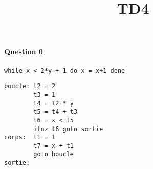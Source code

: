 \documentclass[a4paper, 11pt]{article}
\title{TD4}
\begin{document}
\maketitle

\paragraph{Question 0}

{\tt while x < 2*y + 1 do x = x+1 done}

\begin{verbatim}
boucle: t2 = 2
        t3 = 1
        t4 = t2 * y
        t5 = t4 + t3
        t6 = x < t5
        ifnz t6 goto sortie
corps:	t1 = 1
        t7 = x + t1
        goto boucle
sortie:
\end{verbatim}
\end{document}

